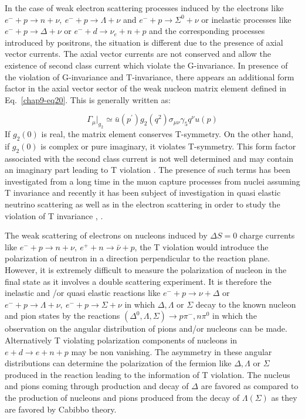 In the case of weak electron scattering processes induced by the electrons like  $e^-+p\rightarrow n+\nu,~ e^-+p\rightarrow\Lambda+\nu$ and $e^-+p\rightarrow \Sigma^0+\nu$ or inelastic processes like $e^-+p\rightarrow \Delta+\nu$ or $e^-+d\rightarrow \nu_e+n+p$ and the corresponding processes introduced by positrons, the situation is different due to the presence of axial vector currents. The axial vector currents are not conserved and allow the existence of second class current which violate the G-invariance. In presence of the violation of G-invariance and T-invariance, there appears an additional form factor in the axial vector sector of the weak nucleon matrix element defined in Eq.~\ref{chap9-eq20}. This is generally written as: 

\begin{equation}
\Gamma_\mu|_{g_2} \simeq  \bar u(p^\prime) g_2(q^2) \sigma_{\mu \nu} \gamma_5 q^\nu u(p) \label{chap9-eq40}
\end{equation}
If $g_2(0)$ is real, the matrix element conserves T-symmetry. 
On the other hand, if  $g_2(0)$ is complex or pure imaginary, it violates T-symmetry. 
This form factor associated with the second class current is not well determined and may contain an imaginary part leading to T violation \cite{chap9-key16}. The presence of such terms has been investigated from a long time in the muon capture processes from nuclei assuming T invariance and recently it has been subject of investigation in quasi elastic neutrino scattering as well as in the electron scattering in order to study the violation of T invariance \cite{chap9-key14}, \cite{chap9-key15}.
 
The weak scattering of electrons on nucleons induced by $\Delta S=0$ charge currents like $e^-+p\rightarrow n+\nu,~ e^++n\rightarrow \bar{\nu}+p$, the T violation would introduce the polarization of neutron in a direction perpendicular to the reaction plane. However, it is extremely difficult to measure the polarization of nucleon in the final state as  it involves a double scattering experiment. It is therefore the inelastic and /or quasi elastic reactions like $e^-+p\rightarrow \nu+\Delta$ or $ e^-+p\rightarrow \Lambda
+\nu,~ e^-+p\rightarrow \Sigma+\nu$ in which $\Delta, \Lambda$ or $ \Sigma$ decay to the known nucleon and pion states by the reactions $(\Delta^0,\Lambda,\Sigma)\rightarrow p\pi^-,n\pi^0$ in which the observation on the angular distribution of pions and/or nucleons can be made. Alternatively T violating polarization components of nucleons in $e+d\rightarrow e+n+p$ may be non vanishing. The asymmetry in these angular distributions can determine the polarization of the fermion like $\Delta,\Lambda$ or $\Sigma$ produced in the reaction leading to the information of T violation. The nucleus and pions coming through production and decay  of $\Delta$ are favored as compared to the production of nucleons and pions produced from the decay of $\Lambda(\Sigma)$ as they are favored by Cabibbo theory.
    
